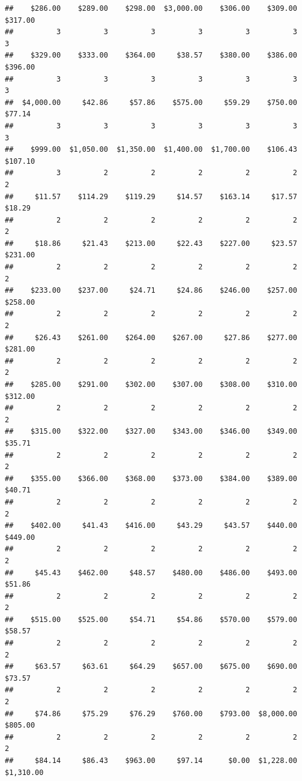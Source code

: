 \begin{verbatim}
##    $286.00    $289.00    $298.00  $3,000.00    $306.00    $309.00    $317.00 
##          3          3          3          3          3          3          3 
##    $329.00    $333.00    $364.00     $38.57    $380.00    $386.00    $396.00 
##          3          3          3          3          3          3          3 
##  $4,000.00     $42.86     $57.86    $575.00     $59.29    $750.00     $77.14 
##          3          3          3          3          3          3          3 
##    $999.00  $1,050.00  $1,350.00  $1,400.00  $1,700.00    $106.43    $107.10 
##          3          2          2          2          2          2          2 
##     $11.57    $114.29    $119.29     $14.57    $163.14     $17.57     $18.29 
##          2          2          2          2          2          2          2 
##     $18.86     $21.43    $213.00     $22.43    $227.00     $23.57    $231.00 
##          2          2          2          2          2          2          2 
##    $233.00    $237.00     $24.71     $24.86    $246.00    $257.00    $258.00 
##          2          2          2          2          2          2          2 
##     $26.43    $261.00    $264.00    $267.00     $27.86    $277.00    $281.00 
##          2          2          2          2          2          2          2 
##    $285.00    $291.00    $302.00    $307.00    $308.00    $310.00    $312.00 
##          2          2          2          2          2          2          2 
##    $315.00    $322.00    $327.00    $343.00    $346.00    $349.00     $35.71 
##          2          2          2          2          2          2          2 
##    $355.00    $366.00    $368.00    $373.00    $384.00    $389.00     $40.71 
##          2          2          2          2          2          2          2 
##    $402.00     $41.43    $416.00     $43.29     $43.57    $440.00    $449.00 
##          2          2          2          2          2          2          2 
##     $45.43    $462.00     $48.57    $480.00    $486.00    $493.00     $51.86 
##          2          2          2          2          2          2          2 
##    $515.00    $525.00     $54.71     $54.86    $570.00    $579.00     $58.57 
##          2          2          2          2          2          2          2 
##     $63.57     $63.61     $64.29    $657.00    $675.00    $690.00     $73.57 
##          2          2          2          2          2          2          2 
##     $74.86     $75.29     $76.29    $760.00    $793.00  $8,000.00    $805.00 
##          2          2          2          2          2          2          2 
##     $84.14     $86.43    $963.00     $97.14      $0.00  $1,228.00  $1,310.00 

\end{verbatim}
